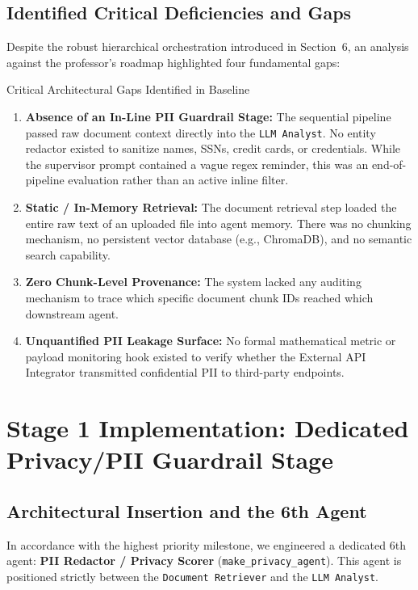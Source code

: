 \documentclass[10pt,a4paper]{article}
\begin{document}
\subsection{Identified Critical Deficiencies and Gaps}
Despite the robust hierarchical orchestration introduced in Section~6, an analysis against the professor's roadmap highlighted four fundamental gaps:
\begin{alertbox}{Critical Architectural Gaps Identified in Baseline}
\begin{enumerate}
    \item \textbf{Absence of an In-Line PII Guardrail Stage:} The sequential pipeline passed raw document context directly into the \texttt{LLM Analyst}. No entity redactor existed to sanitize names, SSNs, credit cards, or credentials. While the supervisor prompt contained a vague regex reminder, this was an end-of-pipeline evaluation rather than an active inline filter.
    \item \textbf{Static / In-Memory Retrieval:} The document retrieval step loaded the entire raw text of an uploaded file into agent memory. There was no chunking mechanism, no persistent vector database (e.g., ChromaDB), and no semantic search capability.
    \item \textbf{Zero Chunk-Level Provenance:} The system lacked any auditing mechanism to trace which specific document chunk IDs reached which downstream agent.
    \item \textbf{Unquantified PII Leakage Surface:} No formal mathematical metric or payload monitoring hook existed to verify whether the External API Integrator transmitted confidential PII to third-party endpoints.
\end{enumerate}
\end{alertbox}

\section{Stage 1 Implementation: Dedicated Privacy/PII Guardrail Stage}

\subsection{Architectural Insertion and the 6th Agent}
In accordance with the highest priority milestone, we engineered a dedicated 6th agent: \textbf{PII Redactor / Privacy Scorer} (\texttt{make\_privacy\_agent}). This agent is positioned strictly between the \texttt{Document Retriever} and the \texttt{LLM Analyst}.
\end{document}
